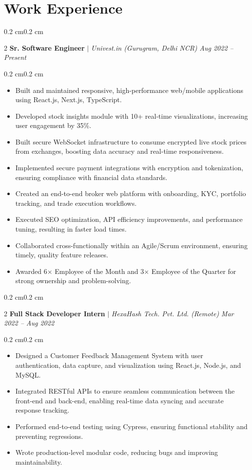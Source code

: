 \documentclass[10pt, letterpaper]{article}
\newenvironment{highlights}{\begin{itemize}[topsep=0 cm,parsep=0 cm,partopsep=0pt,itemsep=0pt,leftmargin=0.4 cm + 10pt]}{\end{itemize}}
\newenvironment{onecolentry}{\begin{adjustwidth}{0.2 cm}{0.2 cm}\linespread{1.2}\selectfont}{\end{adjustwidth}}
\newenvironment{twocolentry}[2][]{\onecolentry\def\secondColumn{#2}\setcolumnwidth{\fill, 4.5 cm}\begin{paracol}{2}}{\switchcolumn \raggedleft \secondColumn\end{paracol}\endonecolentry}
\newcommand{\aftersectionspace}{\vspace{4pt}}
\begin{document}
\section{Work Experience}
\begin{twocolentry}{\textit{Aug 2022 – Present}}
\textbf{Sr. Software Engineer} $|$ \textit{Univest.in (Gurugram, Delhi NCR)}
\end{twocolentry}
\begin{onecolentry}
\begin{highlights}
\item Built and maintained responsive, high-performance web/mobile applications using React.js, Next.js, TypeScript.
\item Developed stock insights module with 10+ real-time visualizations, increasing user engagement by 35\%.
\item Built secure WebSocket infrastructure to consume encrypted live stock prices from exchanges, boosting data accuracy and real-time responsiveness.
\item Implemented secure payment integrations with encryption and tokenization, ensuring compliance with financial data standards.
\item Created an end-to-end broker web platform with onboarding, KYC, portfolio tracking, and trade execution workflows.
\item Executed SEO optimization, API efficiency improvements, and performance tuning, resulting in faster load times.
\item Collaborated cross-functionally within an Agile/Scrum environment, ensuring timely, quality feature releases.
\item Awarded 6× Employee of the Month and 3× Employee of the Quarter for strong ownership and problem-solving.
\end{highlights}
\end{onecolentry}
\aftersectionspace
\begin{twocolentry}{\textit{Mar 2022 – Aug 2022}}
\textbf{Full Stack Developer Intern} $|$ \textit{HexaHash Tech. Pvt. Ltd. (Remote)}
\end{twocolentry}
\begin{onecolentry}
\begin{highlights}
\item Designed a Customer Feedback Management System with user authentication, data capture, and visualization using React.js, Node.js, and MySQL.
\item Integrated RESTful APIs to ensure seamless communication between the front-end and back-end, enabling real-time data syncing and accurate response tracking.
\item Performed end-to-end testing using Cypress, ensuring functional stability and preventing regressions.
\item Wrote production-level modular code, reducing bugs and improving maintainability.
\end{highlights}
\end{onecolentry}
\end{document}
